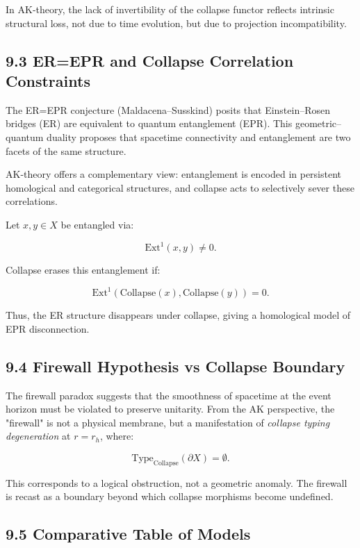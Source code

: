\documentclass[11pt]{article}
\begin{document}
In AK-theory, the lack of invertibility of the collapse functor reflects intrinsic structural loss, not due to time evolution, but due to projection incompatibility.

\subsection*{9.3 ER=EPR and Collapse Correlation Constraints}

The ER=EPR conjecture (Maldacena–Susskind) posits that Einstein–Rosen bridges (ER) are equivalent to quantum entanglement (EPR). This geometric–quantum duality proposes that spacetime connectivity and entanglement are two facets of the same structure.

AK-theory offers a complementary view: entanglement is encoded in persistent homological and categorical structures, and collapse acts to selectively sever these correlations.

Let \( x, y \in X \) be entangled via:

\[
\mathrm{Ext}^1(x, y) \not= 0.
\]

Collapse erases this entanglement if:

\[
\mathrm{Ext}^1(\mathrm{Collapse}(x), \mathrm{Collapse}(y)) = 0.
\]

Thus, the ER structure disappears under collapse, giving a homological model of EPR disconnection.

\subsection*{9.4 Firewall Hypothesis vs Collapse Boundary}

The firewall paradox suggests that the smoothness of spacetime at the event horizon must be violated to preserve unitarity. From the AK perspective, the "firewall" is not a physical membrane, but a manifestation of \emph{collapse typing degeneration} at \( r = r_h \), where:

\[
\mathrm{Type}_{\mathrm{Collapse}}(\partial X) = \emptyset.
\]

This corresponds to a logical obstruction, not a geometric anomaly. The firewall is recast as a boundary beyond which collapse morphisms become undefined.

\subsection*{9.5 Comparative Table of Models}
\end{document}
